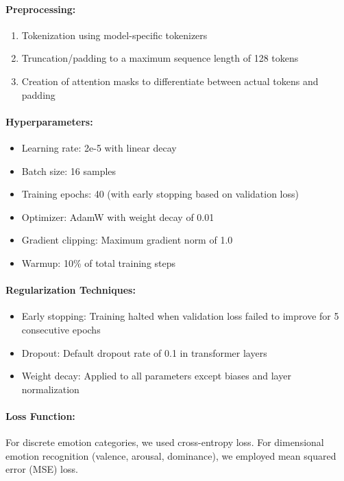 \documentclass[12pt]{article}
\begin{document}
\paragraph{Preprocessing:}
\begin{enumerate}
    \item Tokenization using model-specific tokenizers
    \item Truncation/padding to a maximum sequence length of 128 tokens
    \item Creation of attention masks to differentiate between actual tokens and padding
\end{enumerate}

\paragraph{Hyperparameters:}
\begin{itemize}
    \item Learning rate: 2e-5 with linear decay
    \item Batch size: 16 samples
    \item Training epochs: 40 (with early stopping based on validation loss)
    \item Optimizer: AdamW with weight decay of 0.01
    \item Gradient clipping: Maximum gradient norm of 1.0
    \item Warmup: 10\% of total training steps
\end{itemize}

\paragraph{Regularization Techniques:}
\begin{itemize}
    \item Early stopping: Training halted when validation loss failed to improve for 5 consecutive epochs
    \item Dropout: Default dropout rate of 0.1 in transformer layers
    \item Weight decay: Applied to all parameters except biases and layer normalization
\end{itemize}

\paragraph{Loss Function:}
For discrete emotion categories, we used cross-entropy loss. For dimensional emotion recognition (valence, arousal, dominance), we employed mean squared error (MSE) loss.
\end{document}
